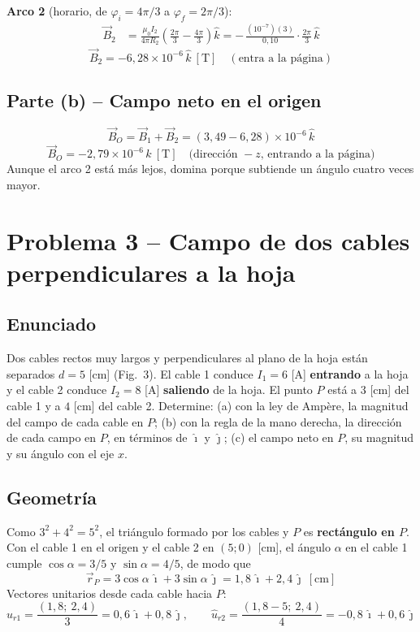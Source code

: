 \documentclass[12pt,letterpaper]{article}
\begin{document}
\noindent\textbf{Arco 2} (horario, de $\varphi_i = 4\pi/3$ a $\varphi_f = 2\pi/3$):
\begin{align*}
    \vec{B}_2 &= \frac{\mu_0 I_2}{4\pi R_2}\left(\frac{2\pi}{3} - \frac{4\pi}{3}\right)\hat{k}
    = -\,\frac{(10^{-7})(3)}{0{,}10}\cdot\frac{2\pi}{3}\,\hat{k}
\end{align*}
\[
    \boxed{\vec{B}_2 = -6{,}28\times10^{-6}\,\hat{k}\ [\text{T}]\quad(\text{entra a la p\'agina})}
\]

\subsection*{Parte (b) -- Campo neto en el origen}
\[
    \vec{B}_O = \vec{B}_1 + \vec{B}_2 = (3{,}49 - 6{,}28)\times10^{-6}\,\hat{k}
\]
\[
    \boxed{\vec{B}_O = -2{,}79\times10^{-6}\,\hat{k}\ [\text{T}]\quad\text{(direcci\'on } -z\text{, entrando a la p\'agina)}}
\]
Aunque el arco 2 est\'a m\'as lejos, domina porque subtiende un \'angulo cuatro veces mayor.

\newpage
\section*{Problema 3 -- Campo de dos cables perpendiculares a la hoja}

\subsection*{Enunciado}

Dos cables rectos muy largos y perpendiculares al plano de la hoja est\'an separados $d = 5$ [cm]
(Fig.\ 3). El cable 1 conduce $I_1 = 6$ [A] \textbf{entrando} a la hoja y el cable 2 conduce
$I_2 = 8$ [A] \textbf{saliendo} de la hoja. El punto $P$ est\'a a $3$ [cm] del cable 1 y a $4$ [cm]
del cable 2. Determine: (a) con la ley de Amp\`ere, la magnitud del campo de cada cable en $P$;
(b) con la regla de la mano derecha, la direcci\'on de cada campo en $P$, en t\'erminos de
$\hat{\imath}$ y $\hat{\jmath}$; (c) el campo neto en $P$, su magnitud y su \'angulo con el eje $x$.

\subsection*{Geometr\'ia}

Como $3^2 + 4^2 = 5^2$, el tri\'angulo formado por los cables y $P$ es \textbf{rect\'angulo en $P$}.
Con el cable 1 en el origen y el cable 2 en $(5;0)$ [cm], el \'angulo $\alpha$ en el cable 1 cumple
$\cos\alpha = 3/5$ y $\sin\alpha = 4/5$, de modo que
\[
    \vec{r}_P = 3\cos\alpha\,\hat{\imath} + 3\sin\alpha\,\hat{\jmath} = 1{,}8\,\hat{\imath} + 2{,}4\,\hat{\jmath}\ [\text{cm}]
\]
Vectores unitarios desde cada cable hacia $P$:
\[
    \hat{u}_{r1} = \frac{(1{,}8;\ 2{,}4)}{3} = 0{,}6\,\hat{\imath} + 0{,}8\,\hat{\jmath},\qquad
    \hat{u}_{r2} = \frac{(1{,}8-5;\ 2{,}4)}{4} = -0{,}8\,\hat{\imath} + 0{,}6\,\hat{\jmath}
\]
\end{document}
